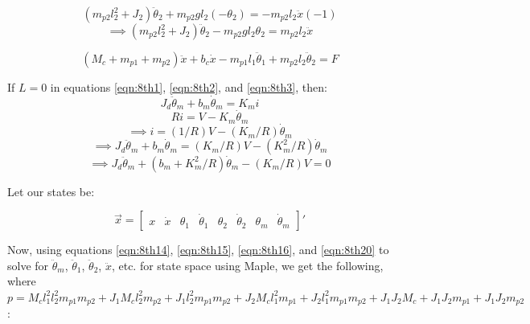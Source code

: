 \documentclass{article}
\begin{document}
\begin{equation*}
(m_{p2} l_2^2 + J_2) \ddot{\theta}_2 + m_{p2} g l_2 (-\theta_2) = -m_{p2} l_2 \ddot{x} (-1)
\end{equation*}
\begin{equation}
\implies (m_{p2} l_2^2 + J_2) \ddot{\theta}_2 - m_{p2} g l_2 \theta_2 = m_{p2} l_2 \ddot{x}
\label{eqn:8th15}
\end{equation}

\begin{equation}
(M_c + m_{p1} + m_{p2}) \ddot{x} + b_c \dot{x} - m_{p1} l_1 \ddot{\theta}_1 + m_{p2} l_2 \ddot{\theta}_2 = F
\label{eqn:8th16}
\end{equation}

If $L = 0$ in equations \ref{eqn:8th1}, \ref{eqn:8th2}, and \ref{eqn:8th3}, then:
\begin{equation*}
J_d \ddot{\theta}_m + b_m \dot{\theta}_m = K_m i
\end{equation*}
\begin{equation*}
R i = V - K_m \dot{\theta}_m
\end{equation*}
\begin{equation}
\implies i = (1/R) V - (K_m/R) \dot{\theta}_m
\label{eqn:i}
\end{equation}
\begin{equation*}
\implies J_d \ddot{\theta}_m + b_m \dot{\theta}_m = (K_m/R) V - (K_m^2/R) \dot{\theta}_m
\end{equation*}
\begin{equation}
\implies J_d \ddot{\theta}_m + (b_m + K_m^2/R) \dot{\theta}_m - (K_m/R) V = 0
\label{eqn:8th20}
\end{equation}

Let our states be:

\begin{equation*}
\vec{x} = \begin{bmatrix}
x & \dot{x} & \theta_1 & \dot{\theta}_1 & \theta_2 & \dot{\theta}_2 & \theta_m & \dot{\theta}_m
\end{bmatrix} '
\end{equation*}

Now, using equations \ref{eqn:8th14}, \ref{eqn:8th15}, \ref{eqn:8th16}, and \ref{eqn:8th20} to solve for $\ddot{\theta}_m$, $\ddot{\theta}_1$, $\ddot{\theta}_2$, $\ddot{x}$, etc. for state space using Maple, we get the following, where $p = M_c l_1^2 l_2^2 m_{p1} m_{p2}+J_1 M_c l_2^2 m_{p2}+J_1 l_2^2 m_{p1} m_{p2}+J_2 M_c l_1^2 m_{p1}+J_2 l_1^2 m_{p1} m_{p2}+J_1 J_2 M_c+J_1 J_2 m_{p1}+J_1 J_2 m_{p2}$:
\end{document}
